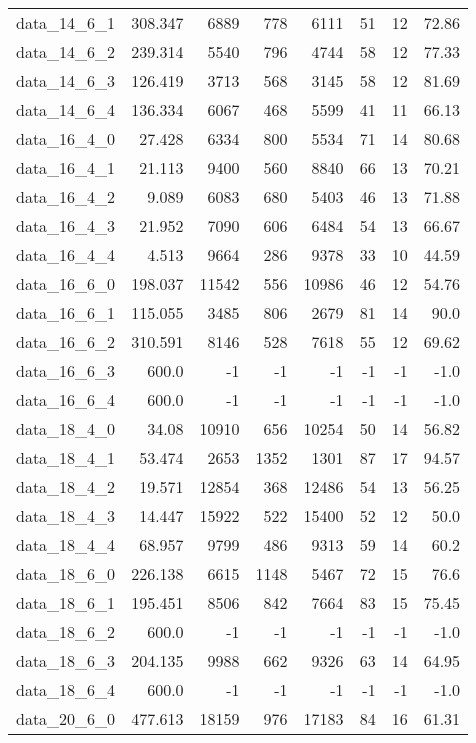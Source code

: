 \begin{tabular}{rrrrrrrr}
  data\_14\_6\_1 & 308.347 & 6889 & 778 & 6111 & 51 & 12 & 72.86 \\
  data\_14\_6\_2 & 239.314 & 5540 & 796 & 4744 & 58 & 12 & 77.33 \\
  data\_14\_6\_3 & 126.419 & 3713 & 568 & 3145 & 58 & 12 & 81.69 \\
  data\_14\_6\_4 & 136.334 & 6067 & 468 & 5599 & 41 & 11 & 66.13 \\
  data\_16\_4\_0 & 27.428 & 6334 & 800 & 5534 & 71 & 14 & 80.68 \\
  data\_16\_4\_1 & 21.113 & 9400 & 560 & 8840 & 66 & 13 & 70.21 \\
  data\_16\_4\_2 & 9.089 & 6083 & 680 & 5403 & 46 & 13 & 71.88 \\
  data\_16\_4\_3 & 21.952 & 7090 & 606 & 6484 & 54 & 13 & 66.67 \\
  data\_16\_4\_4 & 4.513 & 9664 & 286 & 9378 & 33 & 10 & 44.59 \\
  data\_16\_6\_0 & 198.037 & 11542 & 556 & 10986 & 46 & 12 & 54.76 \\
  data\_16\_6\_1 & 115.055 & 3485 & 806 & 2679 & 81 & 14 & 90.0 \\
  data\_16\_6\_2 & 310.591 & 8146 & 528 & 7618 & 55 & 12 & 69.62 \\
  data\_16\_6\_3 & 600.0 & -1 & -1 & -1 & -1 & -1 & -1.0 \\
  data\_16\_6\_4 & 600.0 & -1 & -1 & -1 & -1 & -1 & -1.0 \\
  data\_18\_4\_0 & 34.08 & 10910 & 656 & 10254 & 50 & 14 & 56.82 \\
  data\_18\_4\_1 & 53.474 & 2653 & 1352 & 1301 & 87 & 17 & 94.57 \\
  data\_18\_4\_2 & 19.571 & 12854 & 368 & 12486 & 54 & 13 & 56.25 \\
  data\_18\_4\_3 & 14.447 & 15922 & 522 & 15400 & 52 & 12 & 50.0 \\
  data\_18\_4\_4 & 68.957 & 9799 & 486 & 9313 & 59 & 14 & 60.2 \\
  data\_18\_6\_0 & 226.138 & 6615 & 1148 & 5467 & 72 & 15 & 76.6 \\
  data\_18\_6\_1 & 195.451 & 8506 & 842 & 7664 & 83 & 15 & 75.45 \\
  data\_18\_6\_2 & 600.0 & -1 & -1 & -1 & -1 & -1 & -1.0 \\
  data\_18\_6\_3 & 204.135 & 9988 & 662 & 9326 & 63 & 14 & 64.95 \\
  data\_18\_6\_4 & 600.0 & -1 & -1 & -1 & -1 & -1 & -1.0 \\
  data\_20\_6\_0 & 477.613 & 18159 & 976 & 17183 & 84 & 16 & 61.31 \\

\end{tabular}
